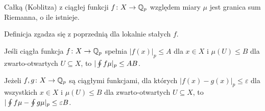 \begin{definicja}
	Całką (Koblitza) z ciągłej funkcji $f \colon X \to \mathbb Q_p$ względem miary $\mu$ jest granica sum Riemanna, o ile istnieje.
\end{definicja}

Definicja zgadza się z poprzednią dla lokalnie stałych $f$.

\begin{fakt}
	Jeśli ciągła funkcja $f \colon X \to \mathbb Q_p$ spełnia $|f(x)|_p \le A$ dla $x \in X$ i $\mu(U) \le B$ dla zwarto-otwartych $U \subseteq X$, to $|\oint f \mu|_p \le AB$.
\end{fakt}

\begin{wniosek}
	Jeżeli $f, g \colon X \to \mathbb Q_p$ są ciągłymi funkcjami, dla których $|f(x) - g(x)|_p \le \varepsilon$ dla wszystkich $x \in X$ i $\mu(U) \le B$ dla zwarto-otwartych $U \subseteq X$, to $
		|\oint f \mu - \oint g\mu|_p \le \varepsilon B$.
\end{wniosek}
